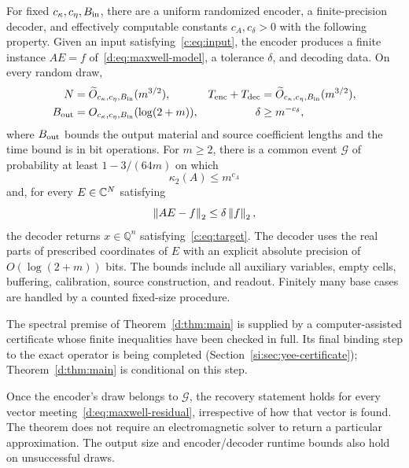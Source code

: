 \begin{theorem}\label{d:thm:main}
For fixed $c_\kappa,c_\eta,B_{\rm in}$, there are a uniform randomized encoder, a finite-precision decoder, and effectively computable constants $c_A,c_\delta>0$ with the following property. Given an input satisfying~\eqref{c:eq:input}, the encoder produces a finite instance $AE=f$ of~\eqref{d:eq:maxwell-model}, a tolerance $\delta$, and decoding data. On every random draw,
\begin{align}\label{d:eq:main-resources}
 N&=\widetilde O_{c_\kappa,c_\eta,B_{\rm in}}(m^{3/2}), &
 T_{\rm enc}+T_{\rm dec}&=\widetilde O_{c_\kappa,c_\eta,B_{\rm in}}(m^{3/2}),\notag\\
 B_{\rm out}&=O_{c_\kappa,c_\eta,B_{\rm in}}(\log(2+m)), &
 \delta&\ge m^{-c_\delta},
\end{align}
where $B_{\rm out}$ bounds the output material and source coefficient lengths and the time bound is in bit operations. For $m\ge2$, there is a common event $\mathcal G$ of probability at least $1-3/(64m)$ on which
\begin{equation}\label{d:eq:main-good}
 \kappa_2(A)\le m^{c_A}
\end{equation}
and, for every $E\in\mathbb C^N$ satisfying
\begin{equation}\label{d:eq:maxwell-residual}
 \left\lVert AE-f\right\rVert_2\le\delta\left\lVert f\right\rVert_2,
\end{equation}
the decoder returns $x\in\mathbb Q^n$ satisfying~\eqref{c:eq:target}. The decoder uses the real parts of prescribed coordinates of $E$ with an explicit absolute precision of $O(\log(2+m))$ bits. The bounds include all auxiliary variables, empty cells, buffering, calibration, source construction, and readout. Finitely many base cases are handled by a counted fixed-size procedure.
\end{theorem}

\begin{remark}
The spectral premise of Theorem~\ref{d:thm:main} is supplied by a
computer-assisted certificate whose finite inequalities have been checked in
full. Its final binding step to the exact operator is being completed
(Section~\ref{si:sec:yee-certificate}); Theorem~\ref{d:thm:main} is
conditional on this step.
\end{remark}

Once the encoder's draw belongs to $\mathcal G$, the recovery statement holds for every vector meeting~\eqref{d:eq:maxwell-residual}, irrespective of how that vector is found. The theorem does not require an electromagnetic solver to return a particular approximation. The output size and encoder/decoder runtime bounds also hold on unsuccessful draws.

